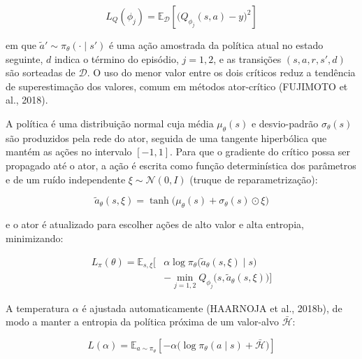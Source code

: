 \documentclass[conference]{IEEEtran}
\begin{document}
\begin{equation}
    L_Q(\phi_j) = \mathbb{E}_{\mathcal{D}} \left[ \big( Q_{\phi_j}(s, a) - y \big)^2 \right]
    \label{eq:sac_critico}
\end{equation}

\noindent em que $\tilde{a}' \sim \pi_\theta(\cdot \mid s')$ é uma ação amostrada da política atual no estado seguinte, $d$ indica o término do episódio, $j = 1, 2$, e as transições $(s, a, r, s', d)$ são sorteadas de $\mathcal{D}$. O uso do menor valor entre os dois críticos reduz a tendência de superestimação dos valores, comum em métodos ator-crítico (FUJIMOTO et al., 2018).

A política é uma distribuição normal cuja média $\mu_\theta(s)$ e desvio-padrão $\sigma_\theta(s)$ são produzidos pela rede do ator, seguida de uma tangente hiperbólica que mantém as ações no intervalo $[-1, 1]$. Para que o gradiente do crítico possa ser propagado até o ator, a ação é escrita como função determinística dos parâmetros e de um ruído independente $\xi \sim \mathcal{N}(0, I)$ (truque de reparametrização):

\begin{equation}
    \tilde{a}_\theta(s, \xi) = \tanh\big( \mu_\theta(s) + \sigma_\theta(s) \odot \xi \big)
    \label{eq:sac_reparam}
\end{equation}

\noindent e o ator é atualizado para escolher ações de alto valor e alta entropia, minimizando:

\begin{equation}
    \begin{aligned}
        L_\pi(\theta) = \mathbb{E}_{s, \xi} \Big[ & \alpha \log \pi_\theta\big(\tilde{a}_\theta(s, \xi) \mid s\big) \\
        & - \min_{j=1,2} Q_{\phi_j}\big(s, \tilde{a}_\theta(s, \xi)\big) \Big]
    \end{aligned}
    \label{eq:sac_ator}
\end{equation}

A temperatura $\alpha$ é ajustada automaticamente (HAARNOJA et al., 2018b), de modo a manter a entropia da política próxima de um valor-alvo $\bar{\mathcal{H}}$:

\begin{equation}
    L(\alpha) = \mathbb{E}_{a \sim \pi_\theta} \left[ -\alpha \big( \log \pi_\theta(a \mid s) + \bar{\mathcal{H}} \big) \right]
    \label{eq:sac_alpha}
\end{equation}
\end{document}
